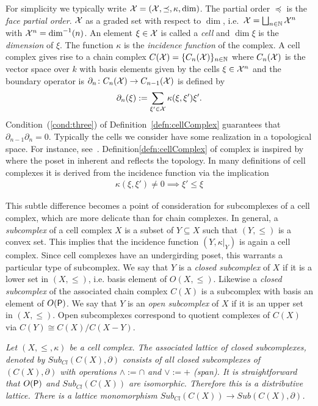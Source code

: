 For simplicity we typically write ${\mathcal X}=({\mathcal X},\preceq,\kappa,\dim)$.  
The partial order $\preceq$ is the {\em face partial order}.
${\mathcal X}$ as a graded set with respect to $\dim$, i.e.\ ${\mathcal X} = \bigsqcup_{n\in {\mathbb{N}}} {\mathcal X}^n$ with ${\mathcal X}^n = \dim^{-1}(n)$.  
An element $\xi\in {\mathcal X}$ is called a {\em cell} and $\dim \xi$ is the {\em dimension} of $\xi$. 
The function $\kappa$ is the {\em incidence function} of the complex.    A cell complex gives rise to a chain complex $C({\mathcal X}) = \{C_n({\mathcal X})\}_{n\in{\mathbb{N}}}$ where $C_n({\mathcal X})$ is the vector space over $k$ with basis elements given by the cells $\xi\in {\mathcal X}^n$ and the boundary operator is $\partial_n\colon C_n({\mathcal X}) \to C_{n-1}({\mathcal X})$ is defined by
\[
\partial_n( \xi) := \sum_{\xi' \in {\mathcal X}} \kappa(\xi, \xi')\xi'.
\]
Condition~(\ref{cond:three}) of Definition~\ref{defn:cellComplex} guarantees that $\partial_{n-1}\partial_n = 0$.  Typically the cells we consider have some realization in a topological space.  For instance, see~\cite{braids}.  Definition\ref{defn:cellComplex} of complex is inspired by~\cite{lefschetz} where the poset in inherent and reflects the topology.  In many definitions of cell complexes it is derived from the incidence function via the implication
\begin{align}\label{eqn:poset}
\kappa (\xi,\xi')\neq 0 \implies \xi'\leq \xi
\end{align}

This subtle difference becomes a point of consideration for subcomplexes of a cell complex, which are more delicate than for chain complexes.  In general, a {\em subcomplex} of a cell complex $X$ is a subset of $Y\subseteq X$ such that $(Y,\leq)$ is a convex set.  This implies that the incidence function $(Y,\kappa|_Y)$ is again a cell complex. Since cell complexes have an undergirding poset, this warrants a particular type of subcomplex.  We say that $Y$ is a {\em closed subcomplex} of $X$ if it is a lower set in $(X,\leq)$, i.e. basis element of $O(X,\leq)$.   Likewise a {\em closed subcomplex} of the associated chain complex $C(X)$ is a subcomplex with basis an element of $O({\mathsf P})$.  We say that $Y$ is an {\em open subcomplex} of $X$ if it is an upper set in $(X,\leq)$.  Open subcomplexes correspond to quotient complexes of $C(X)$ via $C(Y)\cong C(X)/C(X-Y)$.

\begin{ex}
{\em
Let $(X,\leq,\kappa)$ be a cell complex.  The associated {\em lattice of closed subcomplexes}, denoted by $Sub_{Cl}(C(X),\partial)$ consists of all closed subcomplexes of $(C(X),\partial)$ with operations $\wedge:= \cap$ and $\vee := +$ (span).  It is straightforward that $O({\mathsf P})$ and $Sub_{Cl}(C(X))$ are isomorphic.  Therefore this is a distributive lattice.  There is a lattice monomorphism $Sub_{Cl}(C(X))\to Sub(C(X),\partial)$.
}
\end{ex}

